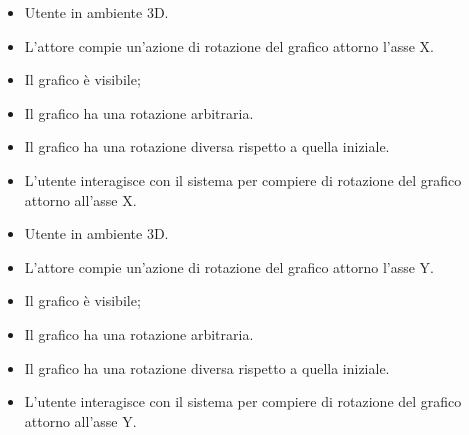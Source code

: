 \UCdsc
{ %
    \begin{itemize}
        \item Utente in ambiente 3D.
    \end{itemize}
}
{ %
    \begin{itemize}
        \item L'attore compie un'azione di rotazione del grafico attorno l'asse X.
    \end{itemize}
}
{ %
    \begin{itemize}
        \item Il grafico è visibile;
        \item Il grafico ha una rotazione arbitraria.
    \end{itemize}
}
{ %
    \begin{itemize}
        \item Il grafico ha una rotazione diversa rispetto a quella iniziale.
    \end{itemize}
}
{ %
    \begin{itemize}
        \item L'utente interagisce con il sistema per compiere di rotazione del grafico attorno all'asse X.
    \end{itemize}
}

\UCdsc
{ %
    \begin{itemize}
        \item Utente in ambiente 3D.
    \end{itemize}
}
{ %
    \begin{itemize}
        \item L'attore compie un'azione di rotazione del grafico attorno l'asse Y.
    \end{itemize}
}
{ %
    \begin{itemize}
        \item Il grafico è visibile;
        \item Il grafico ha una rotazione arbitraria.
    \end{itemize}
}
{ %
    \begin{itemize}
        \item Il grafico ha una rotazione diversa rispetto a quella iniziale.
    \end{itemize}
}
{ %
    \begin{itemize}
        \item L'utente interagisce con il sistema per compiere di rotazione del grafico attorno all'asse Y.
    \end{itemize}
}

